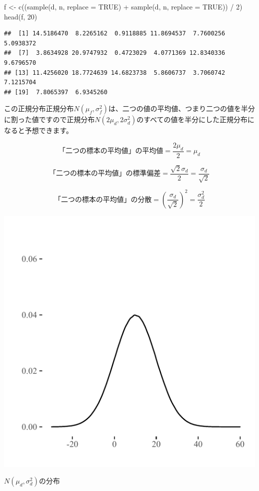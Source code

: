 \documentclass[]{tufte-handout}
\newenvironment{Shaded}{}{}
\newcommand{\AttributeTok}[1]{\textcolor[rgb]{0.49,0.56,0.16}{#1}}
\newcommand{\ConstantTok}[1]{\textcolor[rgb]{0.53,0.00,0.00}{#1}}
\newcommand{\DecValTok}[1]{\textcolor[rgb]{0.25,0.63,0.44}{#1}}
\newcommand{\FunctionTok}[1]{\textcolor[rgb]{0.02,0.16,0.49}{#1}}
\newcommand{\NormalTok}[1]{#1}
\newcommand{\OtherTok}[1]{\textcolor[rgb]{0.00,0.44,0.13}{#1}}
\newcommand{\SpecialCharTok}[1]{\textcolor[rgb]{0.25,0.44,0.63}{#1}}
\begin{document}
\begin{Shaded}
\begin{Highlighting}[numbers=left,,]
\NormalTok{f }\OtherTok{\textless{}{-}} \FunctionTok{c}\NormalTok{((}\FunctionTok{sample}\NormalTok{(d, n, }\AttributeTok{replace =} \ConstantTok{TRUE}\NormalTok{) }\SpecialCharTok{+} \FunctionTok{sample}\NormalTok{(d, n, }\AttributeTok{replace =} \ConstantTok{TRUE}\NormalTok{)) }\SpecialCharTok{/} \DecValTok{2}\NormalTok{)}
\FunctionTok{head}\NormalTok{(f, }\DecValTok{20}\NormalTok{)}
\end{Highlighting}
\end{Shaded}

\begin{verbatim}
##  [1] 14.5186470  8.2265162  0.9118885 11.8694537  7.7600256  5.0938372
##  [7]  3.8634928 20.9747932  0.4723029  4.0771369 12.8340336  9.6796570
## [13] 11.4256020 18.7724639 14.6823738  5.8606737  3.7060742  7.1215704
## [19]  7.8065397  6.9345260
\end{verbatim}

この正規分布正規分布\(N(\mu_f, \sigma^2_f)\)は、二つの値の平均値、つまり二つの値を半分に割った値ですので正規分布\(N(2\mu_d, 2\sigma^2_d)\)のすべての値を半分にした正規分布になると予想できます。

\[\mbox{「二つの標本の平均値」の平均値} = \frac{2\mu_d}{2} = \mu_d\]

\[\mbox{「二つの標本の平均値」の標準偏差} = \frac{\sqrt{2}\sigma_d}{2} = \frac{\sigma_d}{\sqrt{2}}\]

\[\mbox{「二つの標本の平均値」の分散} = (\frac{\sigma_d}{\sqrt{2}})^2 = \frac{\sigma^2_d}{2}\]

\begin{marginfigure}

{\centering \includegraphics{AdditivityOfVariance_files/figure-latex/unnamed-chunk-11-1} 

}

\caption[$N(\mu_d, \sigma^2_d)$の分布]{$N(\mu_d, \sigma^2_d)$の分布}\label{fig:unnamed-chunk-11}
\end{marginfigure}
\end{document}
